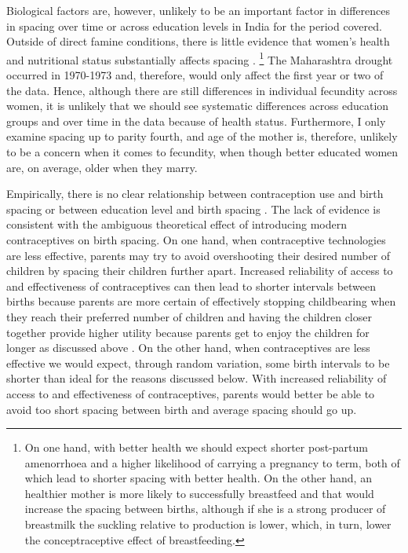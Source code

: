 Biological factors are, however, unlikely to be an important factor in differences in spacing over 
time or across education levels in India for the period covered.
Outside of direct famine conditions, there is little evidence that women's health and 
nutritional status substantially affects spacing \citep{Huffman1987,John1987,lindstrom99}.%
\footnote{
On one hand, with better health we should expect shorter post-partum amenorrhoea and a higher
likelihood of carrying a pregnancy to term, both of which lead to shorter spacing with better health.
On the other hand, an healthier mother is more likely to successfully breastfeed and that would 
increase the spacing between births, although if she is a strong producer of breastmilk the 
suckling relative to production is lower, which, in turn, lower the conceptraceptive effect
of breastfeeding.
}
The Maharashtra drought occurred in 1970-1973 and, therefore, would only affect the first
year or two of the data.
Hence, although there are still differences in individual fecundity across women, it is
unlikely that we should see systematic differences across education groups and over time
in the data because of health status.
Furthermore, I only examine spacing up to parity fourth, and age of the mother is,
therefore, unlikely to be a concern when it comes to fecundity, when though better 
educated women are, on average, older when they marry. 

Empirically, there is no clear relationship between contraception use and birth 
spacing or between education level and birth spacing
\citep{Tulasidhar1993,Whitworth2002,Bhalotra2008,Yeakey2009,Kim2010,Soest2018}.
The lack of evidence is consistent with the ambiguous theoretical effect of introducing 
modern contraceptives on birth spacing.
On one hand, when contraceptive technologies are less effective, parents may try to avoid 
overshooting their desired number of children by spacing their children further apart.
Increased reliability of access to and effectiveness of contraceptives can then lead to 
shorter intervals between births because parents are more certain of effectively
stopping childbearing when they reach their preferred number of children and having
the children closer together provide higher utility because parents get to enjoy the
children for longer as discussed above \citep{Keyfitz1971,Heckman1976}.
On the other hand, when contraceptives are less effective we would expect, through 
random variation, some birth intervals to be shorter than ideal for the reasons 
discussed below.
With increased reliability of access to and effectiveness of contraceptives, parents 
would better be able to avoid too short spacing between birth and average spacing
should go up.

